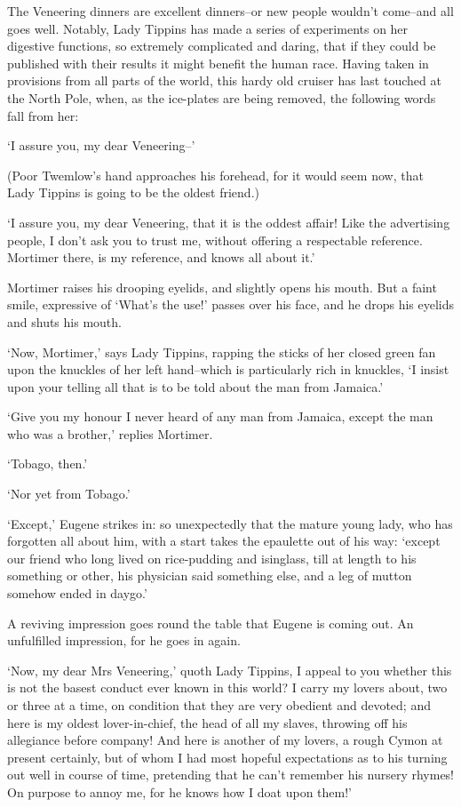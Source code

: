 The Veneering dinners are excellent dinners--or new people wouldn’t
come--and all goes well. Notably, Lady Tippins has made a series of
experiments on her digestive functions, so extremely complicated and
daring, that if they could be published with their results it might
benefit the human race. Having taken in provisions from all parts of the
world, this hardy old cruiser has last touched at the North Pole, when,
as the ice-plates are being removed, the following words fall from her:

‘I assure you, my dear Veneering--’

(Poor Twemlow’s hand approaches his forehead, for it would seem now,
that Lady Tippins is going to be the oldest friend.)

‘I assure you, my dear Veneering, that it is the oddest affair! Like
the advertising people, I don’t ask you to trust me, without offering
a respectable reference. Mortimer there, is my reference, and knows all
about it.’

Mortimer raises his drooping eyelids, and slightly opens his mouth. But
a faint smile, expressive of ‘What’s the use!’ passes over his face, and
he drops his eyelids and shuts his mouth.

‘Now, Mortimer,’ says Lady Tippins, rapping the sticks of her closed
green fan upon the knuckles of her left hand--which is particularly rich
in knuckles, ‘I insist upon your telling all that is to be told about
the man from Jamaica.’

‘Give you my honour I never heard of any man from Jamaica, except the
man who was a brother,’ replies Mortimer.

‘Tobago, then.’

‘Nor yet from Tobago.’

‘Except,’ Eugene strikes in: so unexpectedly that the mature young lady,
who has forgotten all about him, with a start takes the epaulette out
of his way: ‘except our friend who long lived on rice-pudding and
isinglass, till at length to his something or other, his physician said
something else, and a leg of mutton somehow ended in daygo.’

A reviving impression goes round the table that Eugene is coming out. An
unfulfilled impression, for he goes in again.

‘Now, my dear Mrs Veneering,’ quoth Lady Tippins, I appeal to you
whether this is not the basest conduct ever known in this world? I carry
my lovers about, two or three at a time, on condition that they are very
obedient and devoted; and here is my oldest lover-in-chief, the head of
all my slaves, throwing off his allegiance before company! And here is
another of my lovers, a rough Cymon at present certainly, but of whom
I had most hopeful expectations as to his turning out well in course of
time, pretending that he can’t remember his nursery rhymes! On purpose
to annoy me, for he knows how I doat upon them!’

